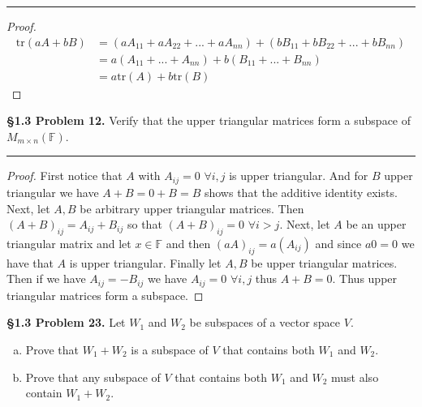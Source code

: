 \documentclass[leqno]{article}
\theoremstyle{nonumberplain}
\newtheorem{proof}{Proof}
\newcommand{\tr}{\mathrm{tr}}
\begin{document}
\noindent\rule[0.5ex]{\linewidth}{1pt}

\begin{proof}
\begin{align*}
\tr(aA+bB)&=(aA_{11}+aA_{22}+...+aA_{nn})+(bB_{11}+bB_{22}+...+bB_{nn})\\
&= a(A_{11}+...+A_{nn})+b(B_{11}+...+B_{nn})\\
&= a\tr(A)+b\tr(B)
\end{align*}
\end{proof}

\pagebreak





\noindent\textbf{\S 1.3 Problem 12.}  Verify that the upper triangular matrices form a subspace of $M_{m\times n}(\mathbb{F})$.

\noindent\rule[0.5ex]{\linewidth}{1pt}

\begin{proof}
First notice that $A$ with $A_{ij}=0$ $\forall i,j$ is upper triangular.  And for $B$ upper triangular we have $A+B=0+B=B$ shows that the additive identity exists.  Next, let $A,B$ be arbitrary upper triangular matrices.  Then $(A+B)_{ij}=A_{ij}+B_{ij}$ so that $(A+B)_{ij} = 0$ $\forall i>j$.  Next, let $A$ be an upper triangular matrix and let $x\in \mathbb{F}$ and then $(aA)_{ij}=a(A_{ij})$ and since $a0=0$ we have that $A$ is upper triangular.  Finally let $A,B$ be upper triangular matrices.  Then if we have $A_{ij}=-B_{ij}$ we have $A_{ij}=0$ $\forall i,j$ thus $A+B=0$.  Thus upper triangular matrices form a subspace.
\end{proof}

\pagebreak




\noindent\textbf{\S 1.3 Problem 23.} Let $W_1$ and $W_2$ be subspaces of a vector space $V$.
\begin{enumerate}[(a)]
\item Prove that $W_1+W_2$ is a subspace of $V$ that contains both $W_1$ and $W_2$.
\item Prove that any subspace of $V$ that contains both $W_1$ and $W_2$ must also contain $W_1+W_2$.
\end{enumerate} 
\end{document}
